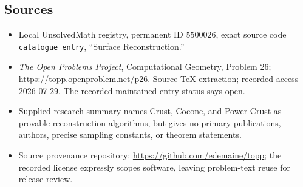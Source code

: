 \documentclass[11pt]{article}
\begin{document}
\subsection{Sources}
\begin{itemize}
\item Local UnsolvedMath registry, permanent ID \(5500026\), exact source code \texttt{catalogue entry}, ``Surface Reconstruction.''
\item \emph{The Open Problems Project}, Computational Geometry, Problem 26; \url{https://topp.openproblem.net/p26}. Source-TeX extraction; recorded access 2026-07-29. The recorded maintained-entry status says open.
\item Supplied research summary names Crust, Cocone, and Power Crust as provable reconstruction algorithms, but gives no primary publications, authors, precise sampling constants, or theorem statements.
\item Source provenance repository: \url{https://github.com/edemaine/topp}; the recorded license expressly scopes software, leaving problem-text reuse for release review.
\end{itemize}
\end{document}

